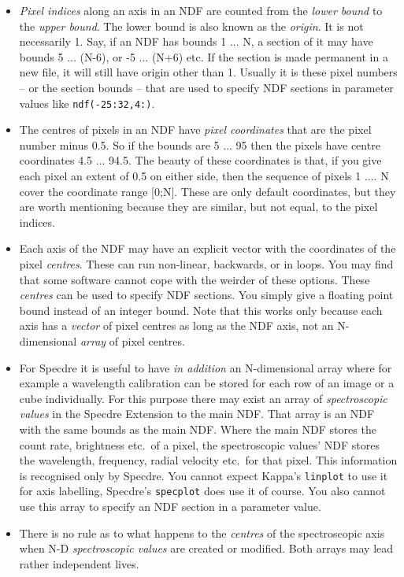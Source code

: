 \documentclass[11pt,twoside]{article}
\begin{document}
\begin{itemize}
\item {\it Pixel indices} along an axis in an NDF are counted from the
   {\it lower bound} to the {\it upper bound}.  The lower bound is also
   known as the {\it origin}.  It is not necessarily 1.  Say, if an NDF
   has bounds 1 ... N, a section of it may have bounds 5 ... (N-6), or
   -5 ... (N+6) etc.  If the section is made permanent in a new file, it
   will still have origin other than 1.  Usually it is these pixel
   numbers -- or the section bounds -- that are used to specify NDF
   sections in parameter values like {\tt ndf(-25:32,4:)}.

\item The centres of pixels in an NDF have {\it pixel coordinates} that
   are the pixel number minus 0.5.  So if the bounds are 5 ... 95 then
   the pixels have centre coordinates 4.5 ... 94.5.  The beauty of
   these coordinates is that, if you give each pixel an extent of
   0.5 on either side, then the sequence of pixels 1 .... N cover the
   coordinate range [0;N].  These are only default coordinates, but
   they are worth mentioning because they are similar, but not equal, to
   the pixel indices.

\item Each axis of the NDF may have an explicit vector with the
   coordinates of the pixel {\it centres}.  These can run non-linear,
   backwards, or in loops.  You may find that some software cannot cope
   with the weirder of these options.  These {\it centres} can be used
   to specify NDF sections.  You simply give a floating point bound
   instead of an integer bound.  Note that this works only because each
   axis has a {\it vector} of pixel centres as long as the NDF axis, not
   an N-dimensional {\it array} of pixel centres.

\item For Specdre it is useful to have {\it in addition} an
   N-dimensional array where for example a wavelength calibration can be
   stored for each row of an image or a cube individually.  For this
   purpose there may exist an array of {\it spectroscopic values} in the
   Specdre Extension to the main NDF.  That array is an NDF with the
   same bounds as the main NDF.  Where the main NDF stores the count
   rate, brightness etc.\ of a pixel, the spectroscopic values' NDF
   stores the wavelength, frequency, radial velocity etc.\ for that
   pixel.  This information is recognised only by Specdre.  You cannot
   expect Kappa's {\tt linplot} to use it for axis labelling, Specdre's
   {\tt specplot} does use it of course.  You also cannot use this array
   to specify an NDF section in a parameter value.

\item There is no rule as to what happens to the {\it centres} of the
   spectroscopic axis when N-D {\it spectroscopic values} are created or
   modified.  Both arrays may lead rather independent lives.
\end{itemize}
\end{document}
